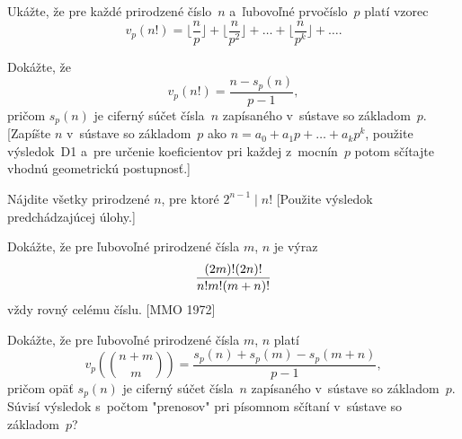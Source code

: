 {Ukážte, že pre každé prirodzené číslo~$n$ a~ľubovoľné prvočíslo~$p$ platí vzorec
$$
v_p(n!)= \Big\lfloor\frac{n}{p}\Big\rfloor + \Big\lfloor\frac{n}{p^2}\Big\rfloor
+ \dots + \Big\lfloor\frac{n}{p^k}\Big\rfloor +\dots.
$$

Dokážte, že $$v_p(n!) = \frac{n - s_p(n)}{p-1},$$ pričom $s_p(n)$ je
ciferný súčet čísla~$n$ zapísaného v~sústave so základom~$p$. [Zapíšte
$n$ v~sústave so základom~$p$ ako $n = a_0 + a_1p + \dots + a_kp^k$,
použite výsledok~D1 a~pre určenie koeficientov pri každej z~mocnín~$p$
potom sčítajte vhodnú geometrickú postupnosť.]

Nájdite všetky prirodzené $n$, pre ktoré $2^{n-1} \mid n!$ [Použite
výsledok predchádzajúcej úlohy.]

Dokážte, že pre ľubovoľné prirodzené čísla $m$, $n$ je výraz
$$
\postdisplaypenalty10000
\frac{(2m)! (2n)!}{n! m! (m+n)!}
$$
vždy rovný celému číslu. [MMO 1972]

Dokážte, že pre ľubovoľné prirodzené čísla $m$, $n$ platí
$$
v_p\left( \binom{n+m}{m} \right) = \frac{s_p(n)+s_p(m)-s_p(m+n)}{p-1},
$$
pričom opäť $s_p(n)$ je ciferný súčet čísla~$n$
zapísaného v~sústave so základom~$p$.
Súvisí výsledok s~počtom "prenosov" pri písomnom sčítaní v~sústave
so základom~$p$?
}

